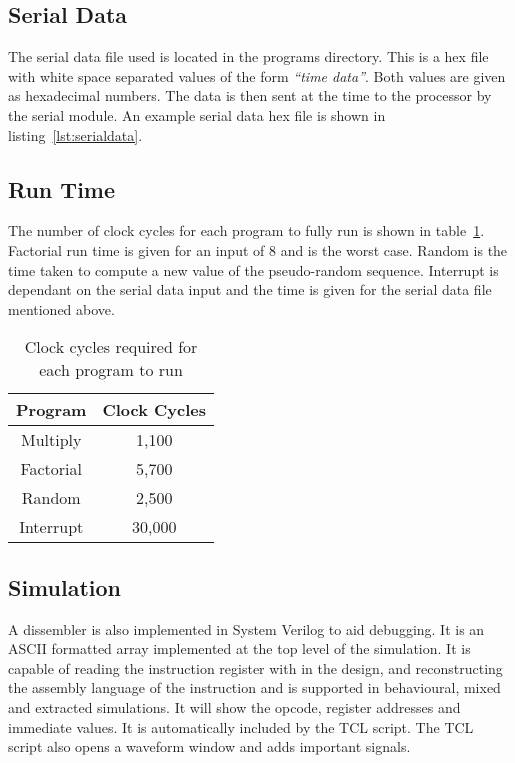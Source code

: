 \subsection{Serial Data}

The serial data file used is located in the programs directory. 
This is a hex file with white space separated values of the form \textit{``time data''}.
Both values are given as hexadecimal numbers. 
The data is then sent at the time to the processor by the serial module. 
An example serial data hex file is shown in listing~\ref{lst:serialdata}.



\subsection{Run Time}
The number of clock cycles for each program to fully run is shown in table~\ref{tab:runtimes}. 
Factorial run time is given for an input of 8 and is the worst case. 
Random is the time taken to compute a new value of the pseudo-random sequence. 
Interrupt is dependant on the serial data input and the time is given for the serial data file mentioned above.

\begin{table}
\centering
\caption{Clock cycles required for each program to run}
\label{tab:runtimes}
\begin{tabular}{|c|c|} \hline
Program & Clock Cycles \\ \hline
Multiply	& 1,100	\\
Factorial	& 5,700	\\
Random		& 2,500	\\
Interrupt	& 30,000	\\ \hline
\end{tabular}
\end{table}

\subsection{Simulation}

A dissembler is also implemented in System Verilog to aid debugging.
It is an ASCII formatted array implemented at the top level of the simulation. 
It is capable of reading the instruction register with in the design, and reconstructing the assembly language of the instruction and is supported in behavioural, mixed and extracted simulations.
It will show the opcode, register addresses and immediate values.
It is automatically included by the TCL script.
The TCL script also opens a waveform window and adds important signals.
